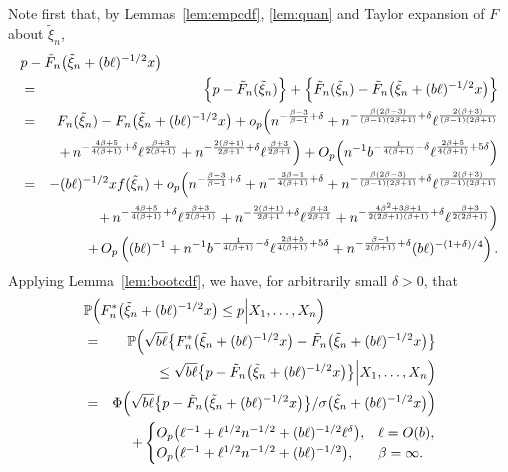 \documentclass[a4paper, 12pt]{article}
\theoremstyle{plain}
\theoremstyle{definition}
\newcommand{\prob}{{\Bbb P}}
\begin{document}
Note first that, by Lemmas~\ref{lem:empcdf}, \ref{lem:quan} and Taylor expansion of $F$ about
$\tilde\xi_n$,
\begin{eqnarray}
\lefteqn{p-\tilde{F}_n\big(\tilde\xi_n+(b\ell)^{-1/2}x\big)}\nonumber\\
&=&\Big\{p-\tilde{F}_n(\tilde\xi_n)\Big\}+
\Big\{\tilde{F}_n(\tilde\xi_n)-\tilde{F}_n\big(\tilde\xi_n+(b\ell)^{-1/2}x\big)\Big\}\nonumber\\
&=& {F}_n(\tilde\xi_n)-{F}_n\big(\tilde\xi_n+(b\ell)^{-1/2}x\big)+
o_p\Big(
n^{-\frac{\beta-3}{\beta-1}+\delta}
+n^{-\frac{\beta(2\beta-3)}{(\beta-1)(2\beta+1)}+\delta}
\ell^{\frac{2(\beta+3)}{(\beta-1)(2\beta+1)}}\nonumber\\
&&+\,n^{-\frac{4\beta+5}{4(\beta+1)}+\delta}
\ell^{\frac{\beta+3}{2(\beta+1)}}+n^{-\frac{2(\beta+1)}{2\beta+1}+\delta}
\ell^{\frac{\beta+3}{2\beta+1}}
\Big)+O_p\Big(n^{-1}b^{-\frac{1}{4(\beta+1)}-\delta}
\ell^{\frac{2\beta+5}{4(\beta+1)}+5\delta}\Big)\nonumber\\
&=&-(b\ell)^{-1/2}xf(\tilde\xi_n)+
o_p\Big(
n^{-\frac{\beta-3}{\beta-1}+\delta}+n^{-\frac{3\beta-1}{4(\beta+1)}+\delta}
+n^{-\frac{\beta(2\beta-3)}{(\beta-1)(2\beta+1)}+\delta}
\ell^{\frac{2(\beta+3)}{(\beta-1)(2\beta+1)}}\nonumber\\
&&+\,n^{-\frac{4\beta+5}{4(\beta+1)}+\delta}
\ell^{\frac{\beta+3}{2(\beta+1)}}+n^{-\frac{2(\beta+1)}{2\beta+1}+\delta}
\ell^{\frac{\beta+3}{2\beta+1}}
+n^{-\frac{4\beta^2+3\beta+1}{2(2\beta+1)(\beta+1)}+\delta}\ell^{\frac{\beta+3}{2(2\beta+1)}}\Big)
\nonumber\\
&& \;\; +\,O_p\left((b\ell)^{-1}+
n^{-1}b^{-\frac{1}{4(\beta+1)}-\delta}
\ell^{\frac{2\beta+5}{4(\beta+1)}+5\delta}
+n^{-\frac{\beta-1}{2(\beta+1)}+\delta}(b\ell)^{-(1+\delta)/4}\right).
\label{pf:main1}
\end{eqnarray}
Applying Lemma~\ref{lem:bootcdf}, we have, for arbitrarily small $\delta>0$, that
\begin{eqnarray}
\lefteqn{\prob\Big(F^*_n\big(\tilde\xi_n+(b\ell)^{-1/2}x\big)\le p\Big|X_1,\ldots,X_n\Big)}\nonumber\\
&=&\prob\Big(\sqrt{b\ell}\big\{F^*_n\big(\tilde\xi_n+(b\ell)^{-1/2}x\big)
-\tilde{F}_n\big(\tilde\xi_n+(b\ell)^{-1/2}x\big)\big\}\nonumber\\
&&\qquad\le \sqrt{b\ell}\big\{p-\tilde{F}_n\big(\tilde\xi_n+(b\ell)^{-1/2}x\big)\big\}
\Big|X_1,\ldots,X_n\Big)\nonumber\\
&=&\Phi\Big(\sqrt{b\ell}\big\{p-\tilde{F}_n\big(\tilde\xi_n+(b\ell)^{-1/2}x\big)\big\}
/\sigma\big(\tilde\xi_n+(b\ell)^{-1/2}x\big)\Big)\nonumber\\
&&+\begin{cases}
O_p\big(\ell^{-1}+\ell^{1/2}n^{-1/2}+(b\ell)^{-1/2}\ell^\delta\big),&
\ell=O(b),\\
O_p\big(\ell^{-1}+\ell^{1/2}n^{-1/2}+(b\ell)^{-1/2}\big),&
\beta=\infty.
\end{cases}
\label{pf:main2}
\end{eqnarray}
\end{document}
